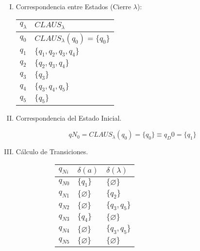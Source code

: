 

\begin{enumerate}[I.]

\item Correspondencia entre Estados (Cierre $\lambda$):\\
{
\begin{flushleft}
\begin{tabular}{l|l}
\textbf{$q_\lambda$} & \textbf{$CLAUS_\lambda$}\\ \hline
\hline
$q_0$ & $CLAUS_\lambda(q_0) = \{q_0\}$ \\ \hline
$q_1$ & $\{q_1,q_2,q_3,q_4\}$ \\ \hline
$q_2$ & $\{q_2, q_3, q_4\}$ \\ \hline
$q_3$ & $\{q_3\}$ \\ \hline
$q_4$ & $\{q_3, q_4, q_5\}$ \\ \hline
$q_5$ & $\{q_5\}$ \\ \hline
\end{tabular} 
\end{flushleft}
}
\item Correspondencia del Estado Inicial.

\begin{equation}
qN_0 = CLAUS_\lambda(q_0) = \{q_0\} \equiv q_D0 = \{q_1\}
\end{equation}


\item Cálculo de Transiciones.
{
\begin{figure}[h]
\centering
\begin{subfigure}[A]{0.4\textwidth}
\centering

\begin{tabular}{l|l|l}
$q_{Ni}$ & $\delta (a)$ & $\delta (\lambda)$ \\ \hline
\hline
$q_{N0}$ & $\{q_1\}$ & $\{\varnothing\}$ \\ \hline
$q_{N1}$ & $\{\varnothing\}$ & $\{q_2\}$ \\ \hline
$q_{N2}$ & $\{\varnothing\}$ & $\{q_3,q_5\}$\\ \hline
$q_{N3}$ & $\{q_4\}$ & $\{\varnothing\}$ \\ \hline
$q_{N4}$ & $\{\varnothing\}$ & $\{q_3,q_5\}$ \\ \hline
$q_{N5}$ & $\{\varnothing\}$ & $\{\varnothing\}$ \\ \hline
\end{tabular} 

\end{subfigure}%
\quad
\begin{subfigure}[B]{0.4\textwidth}
\centering


\end{subfigure}
\end{figure}}
\end{enumerate}
